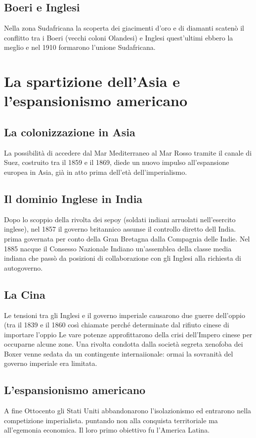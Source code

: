 \documentclass{report}
\begin{document}
\subsection{Boeri e Inglesi}
Nella zona Sudafricana la scoperta dei giacimenti d'oro e di diamanti scatenò il conflitto tra i Boeri (vecchi coloni Olandesi) e Inglesi quest'ultimi ebbero la meglio e nel 1910 formarono l'unione Sudafricana.


\section{La spartizione dell'Asia e l'espansionismo americano}
\subsection{La colonizzazione in Asia}
La possibilità di accedere dal Mar Mediterraneo al Mar Rosso tramite il canale di Suez, costruito tra il 1859 e il 1869, diede un nuovo impulso all'espansione europea in Asia, già in atto prima dell'età dell'imperialismo.


\subsection{Il dominio Inglese in India}
Dopo lo scoppio della rivolta dei sepoy (soldati indiani arruolati nell'esercito inglese), nel 1857 il governo britannico assunse il controllo diretto dell India. prima governata per conto della Gran Bretagna dalla Compagnia delle Indie. Nel 1885 nacque il Consesso Nazionale Indiano un'assemblea della classe media indiana che passò da posizioni di collaborazione con gli Inglesi alla richiesta di autogoverno.

\subsection{La Cina}
Le tensioni tra gli Inglesi e il governo imperiale causarono due guerre dell'oppio (tra il 1839 e il 1860 così chiamate perché determinate dal rifiuto cinese di importare l'oppio Le vare potenze approfittarono della crisi dell'Impero cinese per occuparne alcune zone. Una rivolta condotta dalla società segreta xenofoba dei Boxer venne sedata da un contingente internaiionale: ormai la sovranità del governo imperiale era limitata.

\subsection{L'espansionismo americano}
A fine Ottocento gli Stati Uniti abbandonarono l'isolazionismo ed entrarono nella competizione imperialista. puntando non alla conquista territoriale ma all'egemonia economica. Il loro primo obiettivo fu l'America Latina.
\end{document}
